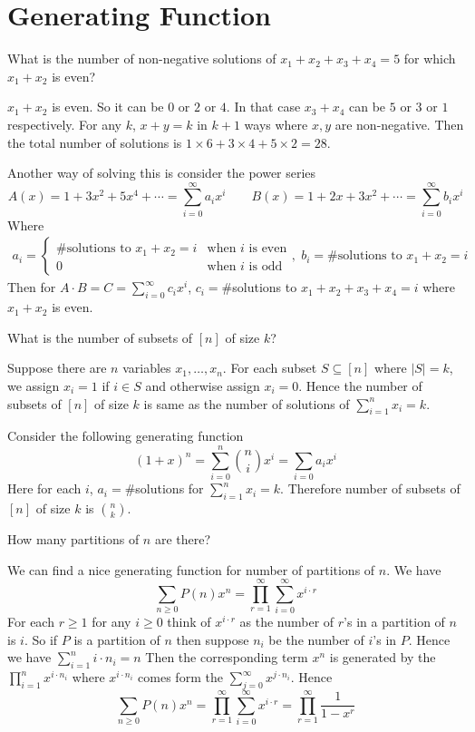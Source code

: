 \documentclass[twoside]{article}
\begin{document}
\section{Generating Function}
\begin{question}{}{}
	What is the number of non-negative solutions of $x_1+x_2+x_3+x_4=5$ for which $x_1+x_2$ is even?
\end{question}
\begin{solution}
	$x_1+x_2$ is even. So it can be $0$ or $2$ or $4$. In that case $x_3+x_4$ can be $5$ or $3$ or $1$ respectively. For any $k$, $x+y=k$  in $k+1$ ways where $x,y$ are non-negative. Then the total number of solutions is $1\times 6+3\times 4+5\times 2=28$.
	
	Another way of solving this is consider the power series $$A(x)=1+3x^2+5x^4+\cdots=\sum_{i=0}^{\infty}a_ix^i\qquad B(x)=1+2x+3x^2+\cdots=\sum_{i=0}^{\infty}b_ix^i$$Where \begin{align*}
		a_i=\begin{cases}
			\#\text{solutions to $x_1+x_2=i$}& \text{when $i$ is even}\\
			0 & \text{when $i$ is odd}
		\end{cases},  &&  b_i=		\#\text{solutions to $x_1+x_2=i$}
	\end{align*}
	Then for $A\cdot B=C=\sum\limits_{i=0}^{\infty}c_ix^i$, $c_i=\#$solutions to $x_1+x_2+x_3+x_4=i$ where $x_1+x_2$ is even.
\end{solution}
\begin{question}{}{}
	What is the number of subsets of $[n]$ of size $k$?
\end{question}
\begin{solution}
	Suppose there are $n$ variables $x_1,\dots, x_n$. For each subset $S\subseteq [n]$ where $|S|=k$, we assign $x_i=1$ if $i\in S$ and otherwise assign $x_i=0$. Hence the number of subsets of $[n]$ of size $k$ is same as the number of solutions of $\sum\limits_{i=1}^nx_i=k$. 
	
	Consider the following generating function $$(1+x)^n=\sum_{i=0}^n \binom{n}ix^i=\sum_{i=0}a_ix^i$$Here for each $i$, $a_i=\#$solutions for $\sum\limits_{i=1}^nx_i=k$. Therefore number of subsets of $[n]$ of size $k$ is $\binom{n}k$. 
\end{solution}
\begin{question}{}{}
	How many partitions of $n$ are there?
\end{question}
\begin{solution}
	We can find a nice generating function for number of partitions of $n$. We have $$\sum_{n\geq 0}P(n)x^n=\prod_{r=1}^{\infty}\sum_{i=0}^{\infty}x^{i\cdot r}$$For each $r\geq 1$ for any $i\geq 0$ think of $x^{i\cdot r}$ as the number of $r$'s in a partition of $n$ is $i$. So if $P$ is a partition of $n$ then suppose $n_i$ be the number of $i$'s in $P$. Hence we have $\sum\limits_{i=1}^ni\cdot n_i=n$ Then the corresponding term $x^n$ is generated by the $\prod\limits_{i=1}^nx^{i\cdot n_i}$ where $x^{i\cdot n_i}$ comes form the $\sum\limits_{j=0}^{\infty}x^{j\cdot n_i}$. Hence $$\sum_{n\geq 0}P(n)x^n=\prod_{r=1}^{\infty}\sum_{i=0}^{\infty}x^{i\cdot r}=\prod_{r=1}^{\infty}\frac1{1-x^r}$$
\end{solution}
\end{document}

